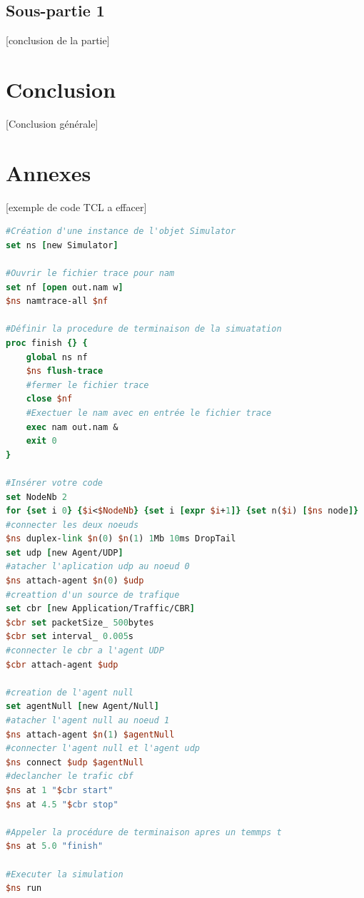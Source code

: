 \documentclass[11pt]{article}
\begin{document}
\subsection{Sous-partie 1}

[conclusion de la partie]




\pagebreak
\section*{Conclusion}
[Conclusion générale]


\pagebreak
\section*{Annexes}





[exemple de code TCL a effacer]


\begin{lstlisting}[language=tcl, caption={exemple Code TCL}]
#Création d'une instance de l'objet Simulator
set ns [new Simulator]

#Ouvrir le fichier trace pour nam
set nf [open out.nam w]
$ns namtrace-all $nf

#Définir la procedure de terminaison de la simuatation
proc finish {} {
	global ns nf
	$ns flush-trace
	#fermer le fichier trace
	close $nf
	#Exectuer le nam avec en entrée le fichier trace
	exec nam out.nam &
	exit 0
}

#Insérer votre code
set NodeNb 2
for {set i 0} {$i<$NodeNb} {set i [expr $i+1]} {set n($i) [$ns node]}
#connecter les deux noeuds
$ns duplex-link $n(0) $n(1) 1Mb 10ms DropTail
set udp [new Agent/UDP]
#atacher l'aplication udp au noeud 0
$ns attach-agent $n(0) $udp 
#creattion d'un source de trafique
set cbr [new Application/Traffic/CBR]
$cbr set packetSize_ 500bytes
$cbr set interval_ 0.005s
#connecter le cbr a l'agent UDP
$cbr attach-agent $udp

#creation de l'agent null
set agentNull [new Agent/Null]
#atacher l'agent null au noeud 1
$ns attach-agent $n(1) $agentNull 
#connecter l'agent null et l'agent udp
$ns connect $udp $agentNull 
#declancher le trafic cbf
$ns at 1 "$cbr start"
$ns at 4.5 "$cbr stop"

#Appeler la procédure de terminaison apres un temmps t 
$ns at 5.0 "finish"

#Executer la simulation
$ns run

\end{lstlisting} 
\end{document}
